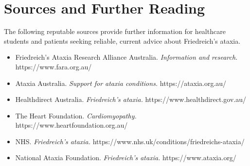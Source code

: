 \section*{Sources and Further Reading}
The following reputable sources provide further information for healthcare students and patients seeking reliable, current advice about Friedreich's ataxia.
\begin{itemize}
    \item Friedreich's Ataxia Research Alliance Australia. \textit{Information and research.} https://www.fara.org.au/
    \item Ataxia Australia. \textit{Support for ataxia conditions.} https://ataxia.org.au/
    \item Healthdirect Australia. \textit{Friedreich's ataxia.} https://www.healthdirect.gov.au/
    \item The Heart Foundation. \textit{Cardiomyopathy.} https://www.heartfoundation.org.au/
    \item NHS. \textit{Friedreich's ataxia.} https://www.nhs.uk/conditions/friedreichs-ataxia/
    \item National Ataxia Foundation. \textit{Friedreich's ataxia.} https://www.ataxia.org/
\end{itemize}
